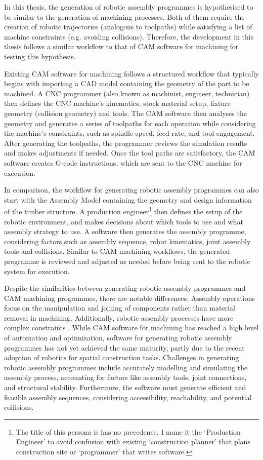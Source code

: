 In this thesis, the generation of robotic assembly programmes is hypothesised to be similar to the generation of machining processes. Both of them require the creation of robotic trajectories (analogous to toolpaths) while satisfying a list of machine constraints (e.g. avoiding collisions). Therefore, the development in this thesis follows a similar workflow to that of CAM software for machining for testing this hypothesis.

Existing CAM software for machining follows a structured workflow that typically begins with importing a CAD model containing the geometry of the part to be machined. A CNC programmer (also known as machinist, engineer, technician) then defines the CNC machine’s kinematics, stock material setup, fixture geometry (collision geometry) and tools. The CAM software then analyses the geometry and generates a series of toolpaths for each operation while considering the machine's constraints, such as spindle speed, feed rate, and tool engagement. After generating the toolpaths, the programmer reviews the simulation results and makes adjustments if needed. Once the tool paths are satisfactory, the CAM software creates G-code instructions, which are sent to the CNC machine for execution.

In comparison, the workflow for generating robotic assembly programmes can also start with the Assembly Model  containing the geometry and design information of the timber structure. A production engineer\footnote{ The title of this persona is has no precedence. I name it the ‘Production Engineer’ to avoid confusion with existing ‘construction planner’ that plans construction site or ‘programmer’ that writes software.} then defines the setup of the robotic environment, and makes decisions about which tools to use and what assembly strategy to use. A software then generates the assembly programme, considering factors such as assembly sequence, robot kinematics, joint assembly tools and collisions. Similar to CAM machining workflows, the generated programme is reviewed and adjusted as needed before being sent to the robotic system for execution.

Despite the similarities between generating robotic assembly programmes and CAM machining programmes, there are notable differences. Assembly operations focus on the manipulation and joining of components rather than material removal in machining. Additionally, robotic assembly processes have more complex constraints \parencite{wangStateArtComputational2021}. While CAM software for machining has reached a high level of automation and optimization, software for generating robotic assembly programmes has not yet achieved the same maturity, partly due to the recent adoption of robotics for spatial construction tasks. Challenges in generating robotic assembly programmes include accurately modelling and simulating the assembly process, accounting for factors like assembly tools, joint connections, and structural stability. Furthermore, the software must generate efficient and feasible assembly sequences, considering accessibility, reachability, and potential collisions.

